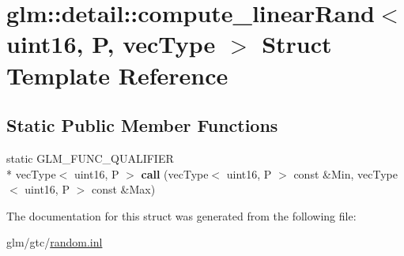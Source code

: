 \hypertarget{structglm_1_1detail_1_1compute__linearRand_3_01uint16_00_01P_00_01vecType_01_4}{\section{glm\-:\-:detail\-:\-:compute\-\_\-linear\-Rand$<$ uint16, P, vec\-Type $>$ Struct Template Reference}
\label{structglm_1_1detail_1_1compute__linearRand_3_01uint16_00_01P_00_01vecType_01_4}
}
\subsection*{Static Public Member Functions}
\begin{DoxyCompactItemize}
\item 
\hypertarget{structglm_1_1detail_1_1compute__linearRand_3_01uint16_00_01P_00_01vecType_01_4_a3a569e5edff462a90e4c2deeeed6f4cf}{static G\-L\-M\-\_\-\-F\-U\-N\-C\-\_\-\-Q\-U\-A\-L\-I\-F\-I\-E\-R \\*
vec\-Type$<$ uint16, P $>$ {\bfseries call} (vec\-Type$<$ uint16, P $>$ const \&Min, vec\-Type$<$ uint16, P $>$ const \&Max)}\label{structglm_1_1detail_1_1compute__linearRand_3_01uint16_00_01P_00_01vecType_01_4_a3a569e5edff462a90e4c2deeeed6f4cf}

\end{DoxyCompactItemize}


The documentation for this struct was generated from the following file\-:\begin{DoxyCompactItemize}
\item 
glm/gtc/\hyperlink{random_8inl}{random.\-inl}\end{DoxyCompactItemize}
